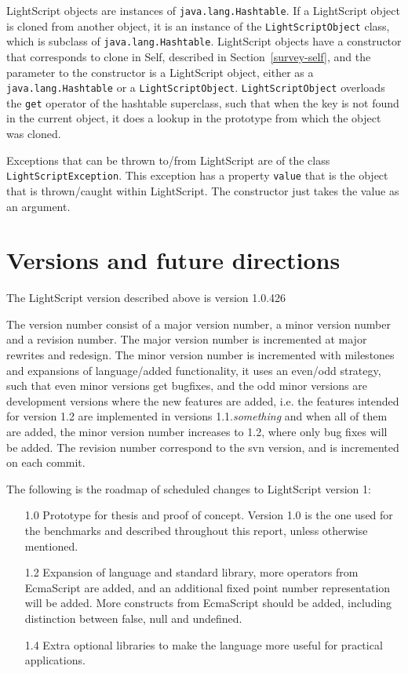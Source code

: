 \documentclass[11pt]{report}
\begin{document}
LightScript objects are instances of \verb|java.lang.Hashtable|. If a LightScript object is cloned from another object, it is an instance of the \verb|LightScriptObject| class, which is subclass of \verb|java.lang.Hashtable|. LightScript objects have a constructor that corresponds to clone in Self, described in Section~\ref{survey-self}, and the parameter to the constructor is a LightScript object, either as a \verb|java.lang.Hashtable| or a \verb|LightScriptObject|. \verb|LightScriptObject| overloads the \verb|get| operator of the hashtable superclass, such that when the key is not found in the current object, it does a lookup in the prototype from which the object was cloned.

Exceptions that can be thrown to/from LightScript are of the class \verb|LightScriptException|. This exception has a property \verb|value| that is the object that is thrown/caught within LightScript. The constructor just takes the value as an argument.

\section{Versions and future directions}
The LightScript version described above is version 1.0.426

The version number consist of a major version number, a minor version number and a revision number.
The major version number is incremented at major rewrites and redesign.
The minor version number is incremented with milestones and expansions of language/added functionality, it uses an even/odd strategy, such that even minor versions get bugfixes, and the odd minor versions are development versions where the new features are added, i.e. 
the features intended for version 1.2 are implemented in versions 1.1.\emph{something} and when all of them are added, the minor version number increases to 1.2, where only bug fixes will be added.
The revision number correspond to the svn version, and is incremented on each commit.

The following is the roadmap of scheduled changes to LightScript version 1:
\begin{itemize}
\item[1.0]
Prototype for thesis and proof of concept.
Version 1.0 is the one used for the benchmarks and described throughout this report, unless otherwise mentioned. 
\item[1.2]
Expansion of language and standard library, more operators from EcmaScript are added,
and an additional fixed point number representation will be added. 
More constructs from EcmaScript should be added, including distinction between false, null and undefined.
\item[1.4]
Extra optional libraries to make the language more useful for practical applications.
\end{itemize}
\end{document}
